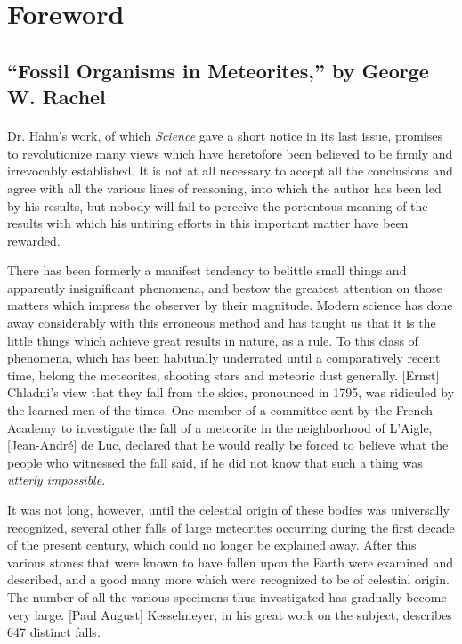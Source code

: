 \documentclass[a4paper, 12pt, oneside]{article}
\begin{document}
\section{Foreword}
\subsection{``Fossil Organisms in Meteorites,'' by George W. Rachel}
\paragraph*{}
Dr. Hahn's work, of which \emph{Science} gave a short notice in its last issue, promises to revolutionize many views which have heretofore been believed to be firmly and irrevocably established. It is not at all necessary to accept all the conclusions and agree with all the various lines of reasoning, into which the author has been led by his results, but nobody will fail to perceive the portentous meaning of the results with which his untiring efforts in this important matter have been rewarded.

There has been formerly a manifest tendency to belittle small things and apparently insignificant phenomena, and bestow the greatest attention on those matters which impress the observer by their magnitude. Modern science has done away considerably with this erroneous method and has taught us that it is the little things which achieve great results in nature, as a rule. To this class of phenomena, which has been habitually underrated until a comparatively recent time, belong the meteorites, shooting stars and meteoric dust generally. [Ernst] Chladni's view that they fall from the skies, pronounced in 1795, was ridiculed by the learned men of the times. One member of a committee sent by the French Academy to investigate the fall of a meteorite in the neighborhood of L'Aigle, [Jean-André] de Luc, declared that he would really be forced to believe what the people who witnessed the fall said, if he did not know that such a thing was \emph{utterly impossible}.

It was not long, however, until the celestial origin of these bodies was universally recognized, several other falls of large meteorites occurring during the first decade of the present century, which could no longer be explained away. After this various stones that were known to have fallen upon the Earth were examined and described, and a good many more which were recognized to be of celestial origin. The number of all the various specimens thus investigated has gradually become very large. [Paul August] Kesselmeyer, in his great work on the subject, describes 647 distinct falls.
\end{document}
